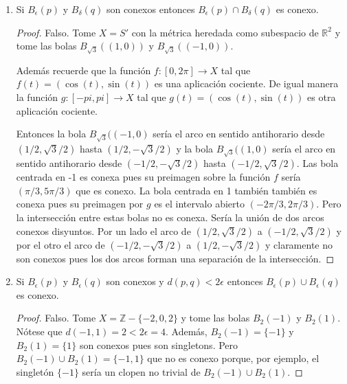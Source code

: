 \documentclass[letter,twoside,12pt]{article}
\begin{document}
\begin{enumerate}
\begin{enumerate}[label=(\alph*)]
\item Si $ B_\epsilon(p) $ y $ B_\delta(q) $ son conexos entonces $ B_\epsilon(p) \cap B_\delta(q) $ es conexo.
\begin{proof}
Falso. Tome $ X= S' $ con la métrica heredada como subespacio de $ \mathbb{R}^2 $ y tome las bolas $ B_{\sqrt{3}}((1,0)) $ y $ B_{\sqrt{3}}((-1,0)) $. 

Además recuerde que la función $ f:[0,2\pi]\to X $ tal que $ f(t)=(\cos(t),\sin(t)) $ es una aplicación cociente. De igual manera la función $ g:[-pi,pi]\to X $ tal que $ g(t)=(\cos(t),\sin(t)) $ es otra aplicación cociente.

Entonces la bola $B_{\sqrt{3}}((-1,0)$ sería el arco en sentido antihorario desde $ (1/2,\sqrt{3}/2) $ hasta $ (1/2,-\sqrt{3}/2) $ y la bola $B_{\sqrt{3}}((1,0)$ sería el arco en sentido antihorario desde $ (-1/2,-\sqrt{3}/2) $ hasta $ (-1/2,\sqrt{3}/2) $. Las bola centrada en -1 es conexa pues su preimagen sobre la función $f$ sería $ (\pi/3,5\pi/3) $ que es conexo. La bola centrada en 1 también también es conexa pues su preimagen por $ g $ es el intervalo abierto $ (-2\pi/3,2\pi/3) $. Pero la intersección entre estas bolas no es conexa. Sería la unión de dos arcos conexos disyuntos. Por un lado el arco de $ (1/2,\sqrt{3}/2) $ a $ (-1/2,\sqrt{3}/2) $ y por el otro el arco de $ (-1/2,-\sqrt{3}/2) $ a $ (1/2,-\sqrt{3}/2) $ y claramente no son conexos pues los dos arcos forman una separación de la intersección. 
\end{proof}


\item Si $B_\epsilon(p)$ y $B_\epsilon(q)$ son conexos y $ d(p,q) <2\epsilon$ entonces $ B_\epsilon(p) \cup B_\epsilon(q) $ es conexo.

\begin{proof}
Falso. Tome $ X = \mathbb{Z}-\{-2,0,2\} $ y tome las bolas $B_2(-1)$ y $B_2(1)$. Nótese que $ d(-1,1)=2<2\epsilon = 4 $. Además, $B_2(-1)= \{-1\}$ y $B_2(1)= \{1\}$ son conexos pues son singletons. Pero $ B_2(-1) \cup B_2(1) = \{-1,1\}$ que no es conexo porque, por ejemplo, el singletón $ \{-1\} $ sería un clopen no trivial de $ B_2(-1) \cup B_2(1) $.
\end{proof}
\end{enumerate}
\end{enumerate}
\end{document}
